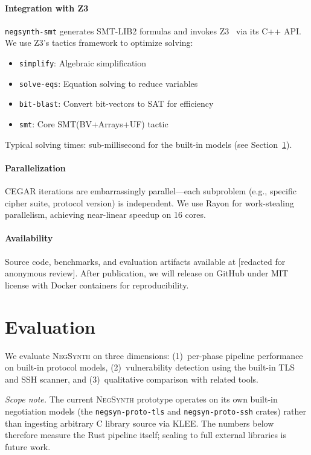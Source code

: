 \documentclass[10pt,twocolumn]{article}
\begin{document}
\paragraph{Integration with Z3}
\texttt{negsynth-smt} generates SMT-LIB2 formulas and invokes Z3~\cite{demoura2008z3} via its C++ API. We use Z3's tactics framework to optimize solving:
\begin{itemize}[leftmargin=*,noitemsep]
\item \texttt{simplify}: Algebraic simplification
\item \texttt{solve-eqs}: Equation solving to reduce variables
\item \texttt{bit-blast}: Convert bit-vectors to SAT for efficiency
\item \texttt{smt}: Core SMT(BV+Arrays+UF) tactic
\end{itemize}

Typical solving times: sub-millisecond for the built-in models (see Section~\ref{sec:evaluation}).

\paragraph{Parallelization}
CEGAR iterations are embarrassingly parallel—each subproblem (e.g., specific cipher suite, protocol version) is independent. We use Rayon for work-stealing parallelism, achieving near-linear speedup on 16 cores.

\paragraph{Availability}
Source code, benchmarks, and evaluation artifacts available at [redacted for anonymous review]. After publication, we will release on GitHub under MIT license with Docker containers for reproducibility.


\section{Evaluation}
\label{sec:evaluation}

We evaluate \textsc{NegSynth} on three dimensions: (1)~per-phase pipeline performance on built-in protocol models, (2)~vulnerability detection using the built-in TLS and SSH scanner, and (3)~qualitative comparison with related tools.

\emph{Scope note.}  The current \textsc{NegSynth} prototype operates on its own built-in negotiation models (the \texttt{negsyn-proto-tls} and \texttt{negsyn-proto-ssh} crates) rather than ingesting arbitrary C library source via KLEE.  The numbers below therefore measure the Rust pipeline itself; scaling to full external libraries is future work.
\end{document}
